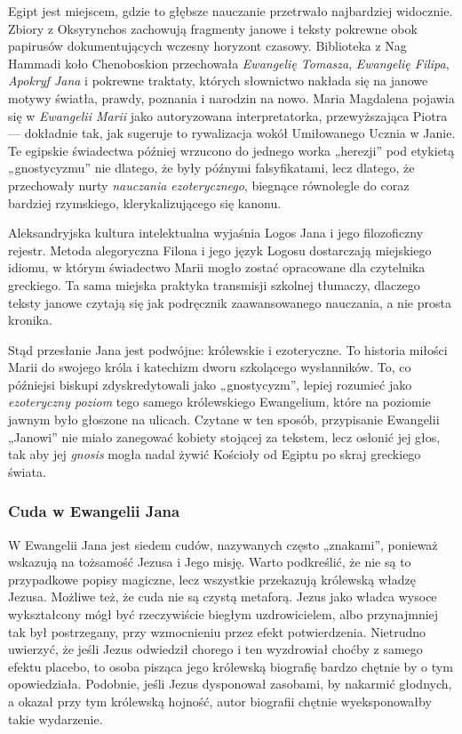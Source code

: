 Egipt jest miejscem, gdzie to głębsze nauczanie przetrwało najbardziej widocznie.
Zbiory z Oksyrynchos zachowują fragmenty janowe i teksty pokrewne obok papirusów dokumentujących wczesny horyzont czasowy.
Biblioteka z Nag Hammadi koło Chenoboskion przechowała \emph{Ewangelię Tomasza}, \emph{Ewangelię Filipa}, \emph{Apokryf Jana} i pokrewne traktaty, których słownictwo nakłada się na janowe motywy światła, prawdy, poznania i narodzin na nowo.
Maria Magdalena pojawia się w \emph{Ewangelii Marii} jako autoryzowana interpretatorka, przewyższająca Piotra --- dokładnie tak, jak sugeruje to rywalizacja wokół Umiłowanego Ucznia w Janie.
Te egipskie świadectwa później wrzucono do jednego worka „herezji” pod etykietą „gnostycyzmu” nie dlatego, że były późnymi falsyfikatami, lecz dlatego, że przechowały nurty \emph{nauczania ezoterycznego}, biegnące równolegle do coraz bardziej rzymskiego, klerykalizującego się kanonu.

Aleksandryjska kultura intelektualna wyjaśnia Logos Jana i jego filozoficzny rejestr.
Metoda alegoryczna Filona i jego język Logosu dostarczają miejskiego idiomu, w którym świadectwo Marii mogło zostać opracowane dla czytelnika greckiego.
Ta sama miejska praktyka transmisji szkolnej tłumaczy, dlaczego teksty janowe czytają się jak podręcznik zaawansowanego nauczania, a nie prosta kronika.

Stąd przesłanie Jana jest podwójne: królewskie i ezoteryczne.
To historia miłości Marii do swojego króla i katechizm dworu szkolącego wysłanników.
To, co późniejsi biskupi zdyskredytowali jako „gnostycyzm”, lepiej rozumieć jako \emph{ezoteryczny poziom} tego samego królewskiego Ewangelium, które na poziomie jawnym było głoszone na ulicach.
Czytane w ten sposób, przypisanie Ewangelii „Janowi” nie miało zanegować kobiety stojącej za tekstem, lecz osłonić jej głos, tak aby jej \emph{gnosis} mogła nadal żywić Kościoły od Egiptu po skraj greckiego świata.

\subsubsection{Cuda w Ewangelii Jana}\label{par:miracles-in-john}

W Ewangelii Jana jest siedem cudów, nazywanych często „znakami”, ponieważ wskazują na tożsamość Jezusa i Jego misję.
Warto podkreślić, że nie są to przypadkowe popisy magiczne, lecz wszystkie przekazują królewską władzę Jezusa.
Możliwe też, że cuda nie są czystą metaforą.
Jezus jako władca wysoce wykształcony mógł być rzeczywiście biegłym uzdrowicielem, albo przynajmniej tak był postrzegany, przy wzmocnieniu przez efekt potwierdzenia.
Nietrudno uwierzyć, że jeśli Jezus odwiedził chorego i ten wyzdrowiał choćby z samego efektu placebo, to osoba pisząca jego królewską biografię bardzo chętnie by o tym opowiedziała.
Podobnie, jeśli Jezus dysponował zasobami, by nakarmić głodnych, a okazał przy tym królewską hojność, autor biografii chętnie wyeksponowałby takie wydarzenie.

